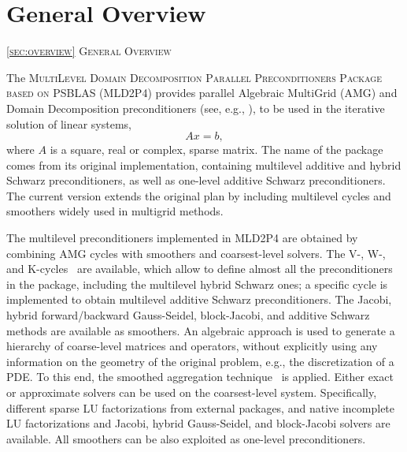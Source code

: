 \section{General Overview\label{sec:overview}}
         {\textsc{\ref{sec:overview} General Overview}}
            
The \textsc{MultiLevel Domain Decomposition Parallel Preconditioners Package based on
PSBLAS (MLD2P4}) provides parallel Algebraic MultiGrid (AMG) and Domain 
Decomposition preconditioners (see, e.g., \cite{Briggs2000,Stuben_01,dd2_96}),
to be used in the iterative solution of  linear systems,
\begin{equation} 
Ax=b, 
\label{system1}
\end{equation} 
where $A$ is a square, real or complex, sparse matrix. 
%
%
The name of the package comes from its original implementation, containing
multilevel additive and hybrid Schwarz preconditioners, as well as one-level additive
Schwarz preconditioners. The current version extends the original plan by including
multilevel cycles and smoothers widely used in multigrid methods.

The multilevel preconditioners implemented in MLD2P4 are obtained by combining
AMG cycles with smoothers and coarsest-level solvers. The V-, W-, and
K-cycles~\cite{Briggs2000,Notay2008} are available, which allow to define
almost all the preconditioners in the package, including the multilevel hybrid
Schwarz ones; a specific cycle is implemented to obtain multilevel additive
Schwarz preconditioners. The Jacobi, hybrid
forward/backward Gauss-Seidel, block-Jacobi, and additive Schwarz methods
are available as smoothers. An algebraic approach is used to generate a hierarchy of
coarse-level matrices and operators, without explicitly using any information on the
geometry of the original problem, e.g., the discretization of a PDE. To this end,
the smoothed aggregation technique~\cite{BREZINA_VANEK,VANEK_MANDEL_BREZINA}
is applied. Either exact or approximate solvers can be used on the coarsest-level
system. Specifically, different sparse LU factorizations from external
packages, and native incomplete LU factorizations and Jacobi, hybrid Gauss-Seidel,
and block-Jacobi solvers are available. All smoothers can be also exploited as one-level 
preconditioners.

